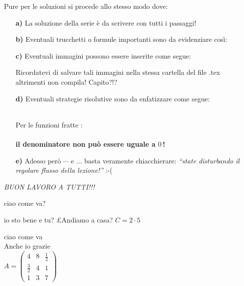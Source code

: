 \documentclass[a4paper,10pt]{article}
\newcommand{\hili}[1]{\colorbox{yellow}{#1}}
\begin{document}
Pure per le soluzioni si procede allo stesso modo dove:
\begin{itemize}
\item[\textbf{a)}] La soluzione della serie \`e da scrivere con tutti i passaggi!
\item[\textbf{b)}] Eventuali trucchetti o formule importanti sono da evidenziare cos\`i:\\
\boxed{\hili{$E=mc^2$}}
\item[\textbf{c)}] Eventuali immagini possono essere inserite come segue:
\begin{center}
\end{center}
Ricordatevi di salvare tali immagini nella stessa cartella del file .tex altrimenti non compila! Capito?!?
\item[\textbf{d)}] Eventuali strategie risolutive sono da enfatizzare come segue:\\\\
\begin{minipage}{3cm}
\begin{center}
\end{center}
\end{minipage}
\hfill
\begin{minipage}{12.5cm}
Per le funzioni fratte :\\\\ \textbf{il denominatore non pu\`o essere uguale a $0$\,!}
\end{minipage} 
\item[\textbf{e)}] Adesso per\`o $\cdots$ e $\ldots$ basta veramente chiacchierare: \textit{``state disturbando il regolare flusso della lezione!''} :-(
\end{itemize}



\begin{center}
\emph{BUON LAVORO A TUTTI!!!}
\end{center}

ciao come va?

io sto bene e tu? £Andiamo a casa?
$C=2\cdot5$




ciao come va\\



Anche io grazie\\


$ 
A = \left (
    \begin {matrix} 
    4 & 8 & \frac {1} {2} \\
    \frac {3} {2} & 4 & 1 \\
    1 & 3 & 7 
    \end {matrix} 
    \right)
    $
\end{document}
